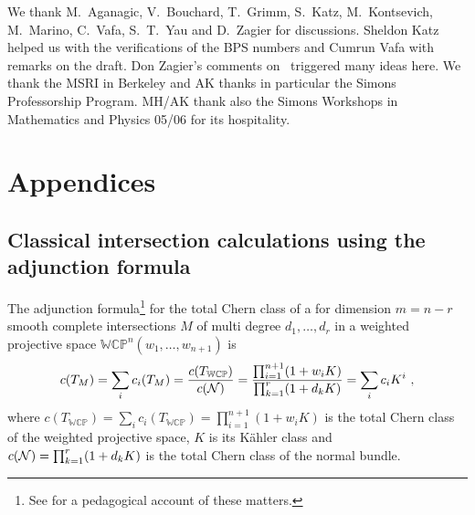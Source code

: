 \documentclass[12pt]{article}
\begin{document}


\vspace{0.2in} {}

We thank M.~Aganagic, V.~Bouchard, T.~Grimm, S.~Katz, M.~Kontsevich, M.~Marino, C.~Vafa,
S.~T.~Yau and D.~Zagier for discussions. Sheldon Katz helped us with
the verifications of the BPS numbers and Cumrun Vafa with remarks
on the draft. Don Zagier's comments on~\cite{Huang} triggered many ideas here.
We thank the MSRI in Berkeley and AK thanks in particular the
Simons Professorship Program. MH/AK thank also the Simons Workshops
in Mathematics and Physics 05/06 for its hospitality.

\appendix

\section{Appendices}
\subsection{Classical intersection calculations using the adjunction
formula}
\label{intersection}

The adjunction formula\footnote{See \cite{fulton} for a
pedagogical account of these matters.} for the total Chern class
of a  for dimension $m=n-r$ smooth complete intersections  $M$ of
multi degree  $d_1,\ldots,d_r$ in a weighted projective space
$\mathbb{WCP}^n(w_1,\ldots,w_{n+1})$ is
\begin{equation}
c(T_M)=\sum_i c_i(T_M)=
{c(T_{\mathbb{WCP}})\over c({\cal N})}= {\prod_{i=1}^{n+1} (1+w_i K)\over \prod_{k=1}^r( 1+ d_k K)}=\sum_i c_i K^i\ ,
\label{adjunction}
\end{equation}
where   $c(T_{\mathbb{WCP}})=\sum_i c_i(T_{\mathbb{WCP}})=\prod_{i=1}^{n+1} (1+w_i K)$
is the total Chern class  of the weighted projective space, $K$ is its K\"ahler class and
$c({\cal N})=\prod_{k=1}^r( 1+ d_k K)$ is  the  total Chern class of the normal bundle.
\end{document}
